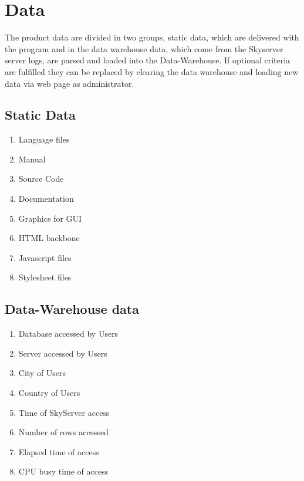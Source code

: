 \section{Data}
The product data are divided in two groups, static data, 
which are delivered with the program and in the data warehouse data, 
which come from the Skyserver server logs, are parsed 
and loaded into the Data-Warehouse. If optional criteria are fulfilled they can be replaced 
by clearing the data warehouse and loading new data via web page as administrator.

\renewcommand{\theenumi}{/D\arabic{enumi}0/}
\renewcommand{\labelenumi}{\theenumi}

\subsection{Static Data}

\begin{enumerate}
  \item Language files
  \item Manual
  \item Source Code
  \item Documentation
  \item Graphics for GUI
  \item HTML backbone
  \item Javascript files
  \item Stylesheet files
\end{enumerate}

\subsection{Data-Warehouse data}

\begin{enumerate}[resume] %
  \item Database accessed by Users
  \item Server accessed by Users
  \item City of Users
  \item Country of Users
  \item Time of SkyServer access
  \item Number of rows accessed
  \item Elapsed time of access
  \item CPU busy time of access
\end{enumerate}